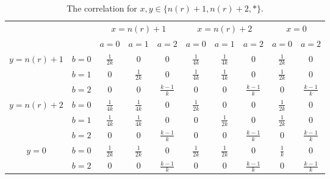 \documentclass[11pt,letterpaper]{article}
\newcommand{\1}{\mathbb{1}}
\newcommand{\nr}{n(r)}
\theoremstyle{definition}
\begin{document}
\begin{table}[H]
\begin{center}
\begin{tabular}{|c|c||c|c|c|c|c|c|c|c|}
\hline
\multicolumn{2}{|c|}{} &
\multicolumn{3}{|c|}{$x=\nr+1$}&
\multicolumn{3}{|c|}{$x=\nr+2$}&
\multicolumn{2}{|c|}{$x=0$}\\
\cline{3-10}
\multicolumn{2}{|c|}{} &
$a = 0$ & $a=1$ & $a=2$ &
$a = 0$ & $a=1$ & $a=2$ &
$a = 0$ & $a =2 $\\
\hline
\hline
\multirow{3}{*}{$y = \nr+1$} & $b=0$ & $\frac{1}{2k}$ & $0$ & 0 
& $\frac{1}{4k}$ & $\frac{1}{4k}$ & 0 & $\frac{1}{2k}$ & 0 \\
\cline{2-10}
&$b=1$ & 0 & $\frac{1}{2k}$ & $0$ 
&  $\frac{1}{4k}$ & $\frac{1}{4k}$ & 0 &$\frac{1}{2k}$ & 0 \\
\cline{2-10}
&$b=2$ & 0 & 0 & $\frac{k-1}{k}$ 
&  0 & 0 &  $\frac{k-1}{k} $ &0 & $\frac{k-1}{k}$ \\
\hline
\multirow{3}{*}{$y = \nr+2$} & $b=0$ & $\frac{1}{4k}$ & $\frac{1}{4k}$ & 0 
& $\frac{1}{2k}$ & $0$ & 0 & $\frac{1}{2k}$ & 0 \\
\cline{2-10}
&$b=1$ & $\frac{1}{4k}$ & $\frac{1}{4k}$ & $0$ 
&  0 & $\frac{1}{2k}$ & $0$ &$\frac{1}{2k}$ & 0 \\
\cline{2-10}
&$b=2$ & 0 & 0 & \small $\frac{k-1}{k}$ 
&  0 & 0 & \small $\frac{k-1}{k} $ &0 &\small $\frac{k-1}{k}$ \\
\hline
\multirow{2}{*}{$y = 0$} & $b=0$ & $\frac{1}{2k}$ & $\frac{1}{2k}$ & 0 
& $\frac{1}{2k}$ & $\frac{1}{2k}$ & 0 & $\frac{1}{k}$ & 0 \\
\cline{2-10}
&$b=2$ & 0 & 0 & $\frac{k-1}{k}$ 
&  0 & 0 & \small $\frac{k-1}{k} $ &0 & \small $\frac{k-1}{k}$ \\
\hline
\end{tabular}
\end{center}
\caption{The correlation for $x ,y\in\{\nr+1,\nr+2, \ast\} $.}
\end{table}
\end{document}
